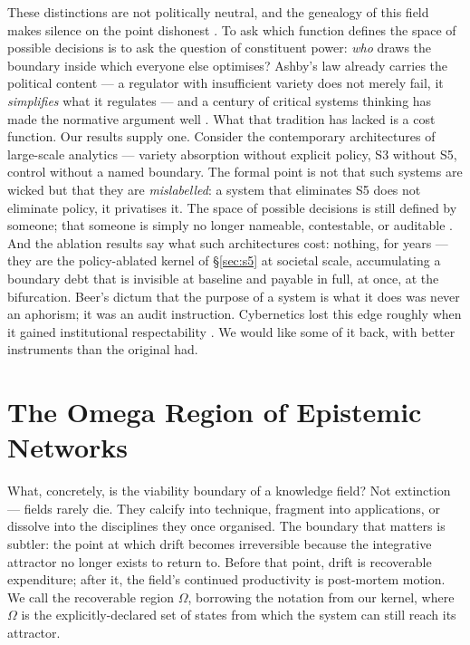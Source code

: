 \documentclass[12pt]{article}
\begin{document}
These distinctions are not politically neutral, and the genealogy of this
field makes silence on the point dishonest \citep{Medina2011}. To ask which
function defines the space of possible decisions is to ask the question of
constituent power: \emph{who} draws the boundary inside which everyone else
optimises? Ashby's law already carries the political content --- a regulator
with insufficient variety does not merely fail, it \emph{simplifies} what it
regulates \citep{Ashby1956} --- and a century of critical systems thinking has
made the normative argument well \citep{Ulrich1983,Midgley2000,Jackson2019}.
What that tradition has lacked is a cost function. Our results supply one.
Consider the contemporary architectures of large-scale analytics --- variety
absorption without explicit policy, S3 without S5, control without a named
boundary. The formal point is not that such systems are wicked but that they
are \emph{mislabelled}: a system that eliminates S5 does not eliminate policy,
it privatises it. The space of possible decisions is still defined by someone;
that someone is simply no longer nameable, contestable, or auditable
\citep{Eubanks2018,Benjamin2019}. And the ablation results say what such
architectures cost: nothing, for years --- they are the policy-ablated kernel of
\S\ref{sec:s5} at societal scale, accumulating a boundary debt that is invisible
at baseline and payable in full, at once, at the bifurcation. Beer's dictum that the purpose of a system
is what it does \citep{Beer1985} was never an aphorism; it was an audit
instruction. Cybernetics lost this edge roughly when it gained institutional
respectability \citep{Mirowski2002}. We would like some of it back, with
better instruments than the original had.

\section{The Omega Region of Epistemic Networks}
\label{sec:omega}


What, concretely, is the viability boundary of a knowledge field? Not
extinction --- fields rarely die. They calcify into technique, fragment into
applications, or dissolve into the disciplines they once organised. The
boundary that matters is subtler: the point at which drift becomes
irreversible because the integrative attractor no longer exists to return to.
Before that point, drift is recoverable expenditure; after it, the field's
continued productivity is post-mortem motion. We call the recoverable region
$\Omega$, borrowing the notation from our kernel, where $\Omega$ is the
explicitly-declared set of states from which the system can still reach its
attractor.
\end{document}
